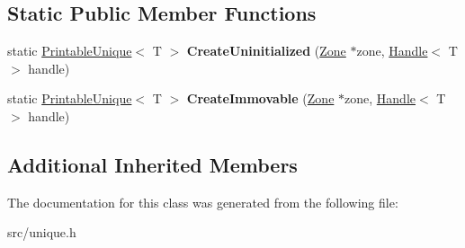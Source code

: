 \subsection*{Static Public Member Functions}
\begin{DoxyCompactItemize}
\item 
\hypertarget{classv8_1_1internal_1_1_printable_unique_acc49fb35b02846398749064823c43ac3}{}static \hyperlink{classv8_1_1internal_1_1_printable_unique}{Printable\+Unique}$<$ T $>$ {\bfseries Create\+Uninitialized} (\hyperlink{classv8_1_1internal_1_1_zone}{Zone} $\ast$zone, \hyperlink{classv8_1_1internal_1_1_handle}{Handle}$<$ T $>$ handle)\label{classv8_1_1internal_1_1_printable_unique_acc49fb35b02846398749064823c43ac3}

\item 
\hypertarget{classv8_1_1internal_1_1_printable_unique_ac0a9880de3754e8b7bc055f0d64db5b7}{}static \hyperlink{classv8_1_1internal_1_1_printable_unique}{Printable\+Unique}$<$ T $>$ {\bfseries Create\+Immovable} (\hyperlink{classv8_1_1internal_1_1_zone}{Zone} $\ast$zone, \hyperlink{classv8_1_1internal_1_1_handle}{Handle}$<$ T $>$ handle)\label{classv8_1_1internal_1_1_printable_unique_ac0a9880de3754e8b7bc055f0d64db5b7}

\end{DoxyCompactItemize}
\subsection*{Additional Inherited Members}


The documentation for this class was generated from the following file\+:\begin{DoxyCompactItemize}
\item 
src/unique.\+h\end{DoxyCompactItemize}
